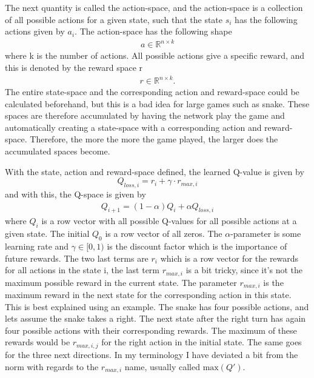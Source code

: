\documentclass[%
 uio,
 jmp,
 amsmath,amssymb,
 reprint, nofootinbib]{revtex4-1}
\numberwithin{equation}{section}
\newcommand{\lp}{\left(}
\newcommand{\rp}{\right)}
\begin{document}
The next quantity is called the action-space, and the action-space is a collection of all possible actions for a given state, such that the state \(s_i\) has the following actions given by \(a_{i}\). The action-space has the following shape
\begin{align}
a\in \mathbb{R}^{n\times k}
\end{align}
where k is the number of actions. All possible actions give a specific reward, and this is denoted by the reward space r
\begin{align}
r\in \mathbb{R}^{n\times k}.
\end{align}
The entire state-space and the corresponding action and reward-space could be calculated beforehand, but this is a bad idea for large games such as snake. These spaces are therefore accumulated by having the network play the game and automatically creating a state-space with a corresponding action and reward-space. Therefore, the more the more the game played, the larger does the accumulated spaces become.

With the state, action and reward-space defined, the learned Q-value is given by
\begin{equation}
Q_{loss, i} = r_i + \gamma \cdot r_{max, i}
\end{equation}
and with this, the Q-space is given by
\begin{align}\label{eq:09}
Q_{i+1} = \lp 1- \alpha\rp Q_i + \alpha Q_{loss, i}
\end{align}
where \(Q_i\) is a row vector with all possible Q-values for all possible actions at a given state. The initial \(Q_0\) is a row vector of all zeros. The \(\alpha\)-parameter is some learning rate and \(\gamma\in [0,1)\) is the discount factor which is the importance of future rewards. The two last terms are \(r_i\) which is a row vector for the rewards for all actions in the state i, the last term \(r_{max, i}\) is a bit tricky, since it's not the maximum possible reward in the current state. The parameter \(r_{max, i}\) is the maximum reward in the next state for the corresponding action in this state. This is best explained using an example. The snake has four possible actions, and lets assume the snake takes a right. The next state after the right turn has again four possible actions with their corresponding rewards. The maximum of these rewards would be \(r_{max, i, j}\) for the right action in the initial state. The same goes for the three next directions. In my terminology I have deviated a bit from the norm with regards to the \(r_{max, i}\) name, usually called \(\text{max}(Q')\).
\end{document}

